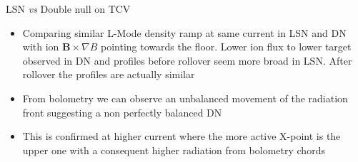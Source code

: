 \documentclass[10pt, compress]{beamer}
\begin{document}
\begin{frame}{LSN \textit{vs} Double null on TCV}
      \begin{itemize}
        \item<1|only@1> Comparing similar L-Mode density ramp at same
          current in LSN and DN with ion $\mathbf{B}\times\nabla B$
          pointing towards the floor. Lower ion flux to lower target
          observed in DN and profiles before rollover seem more broad
          in LSN. After rollover the profiles are actually similar
      \item<2|only@2>  From bolometry we can observe an
          unbalanced movement of the radiation front suggesting a non
          perfectly balanced DN
      \item<3|only@3> This is confirmed at higher current where the
        more active X-point is the upper one with a consequent higher
        radiation from bolometry chords    
      \end{itemize}
\end{frame} 
\end{document}
